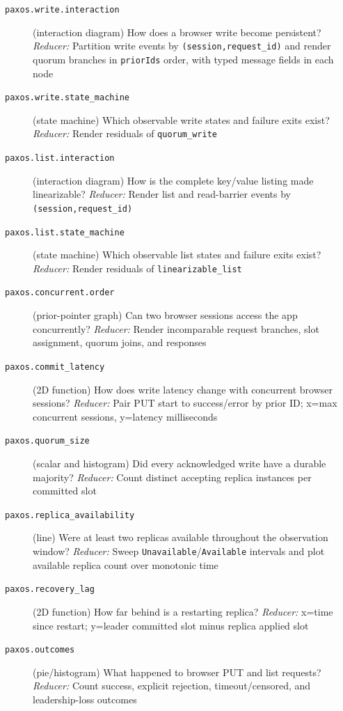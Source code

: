 \begin{description}
\item[\texttt{paxos.write.interaction}] (interaction diagram) How does a browser write become persistent? \emph{Reducer:} Partition write events by \texttt{(session,request\_id)} and render quorum branches in \texttt{priorIds} order, with typed message fields in each node
\item[\texttt{paxos.write.state\_machine}] (state machine) Which observable write states and failure exits exist? \emph{Reducer:} Render residuals of \texttt{quorum\_write}
\item[\texttt{paxos.list.interaction}] (interaction diagram) How is the complete key/value listing made linearizable? \emph{Reducer:} Render list and read-barrier events by \texttt{(session,request\_id)}
\item[\texttt{paxos.list.state\_machine}] (state machine) Which observable list states and failure exits exist? \emph{Reducer:} Render residuals of \texttt{linearizable\_list}
\item[\texttt{paxos.concurrent.order}] (prior-pointer graph) Can two browser sessions access the app concurrently? \emph{Reducer:} Render incomparable request branches, slot assignment, quorum joins, and responses
\item[\texttt{paxos.commit\_latency}] (2D function) How does write latency change with concurrent browser sessions? \emph{Reducer:} Pair PUT start to success/error by prior ID; x=max concurrent sessions, y=latency milliseconds
\item[\texttt{paxos.quorum\_size}] (scalar and histogram) Did every acknowledged write have a durable majority? \emph{Reducer:} Count distinct accepting replica instances per committed slot
\item[\texttt{paxos.replica\_availability}] (line) Were at least two replicas available throughout the observation window? \emph{Reducer:} Sweep \texttt{Unavailable}/\texttt{Available} intervals and plot available replica count over monotonic time
\item[\texttt{paxos.recovery\_lag}] (2D function) How far behind is a restarting replica? \emph{Reducer:} x=time since restart; y=leader committed slot minus replica applied slot
\item[\texttt{paxos.outcomes}] (pie/histogram) What happened to browser PUT and list requests? \emph{Reducer:} Count success, explicit rejection, timeout/censored, and leadership-loss outcomes
\end{description}


